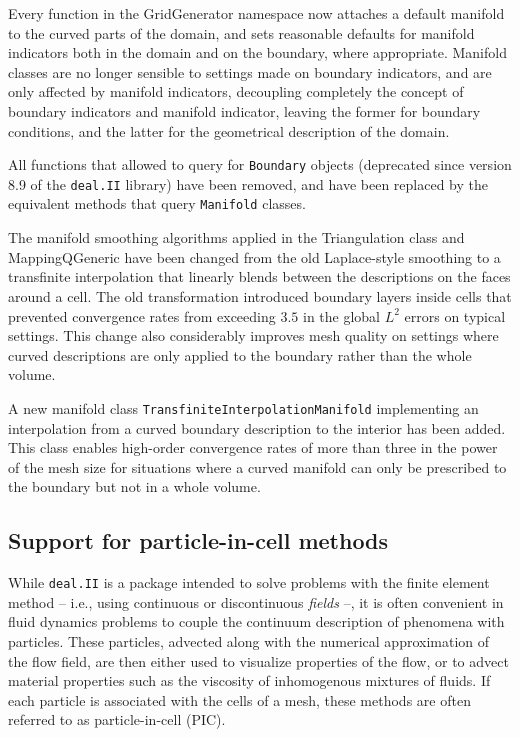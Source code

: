 \documentclass{ansarticle-preprint}
\newcommand{\specialword}[1]{\texttt{#1}}
\newcommand{\dealii}{{\specialword{deal.II}}\xspace}
\begin{document}

Every function in the GridGenerator namespace now attaches a default manifold to
the curved parts of the domain, and sets reasonable defaults for manifold
indicators both in the domain and on the boundary, where appropriate. Manifold
classes are no longer sensible to settings made on boundary indicators, and are
only affected by manifold indicators, decoupling completely the concept of
boundary indicators and manifold indicator, leaving the former for boundary
conditions, and the latter for the geometrical description of the domain.

All functions that allowed to query for \texttt{Boundary} objects (deprecated
since version 8.9 of the \dealii library) have been removed, and have been
replaced by the equivalent methods that query \texttt{Manifold} classes.

The manifold smoothing algorithms applied in the Triangulation class and
MappingQGeneric have been changed from the old Laplace-style smoothing to a
transfinite interpolation that linearly blends between the descriptions on the
faces around a cell. The old transformation introduced boundary layers inside
cells that prevented convergence rates from exceeding \(3.5\) in the global
\(L^2\) errors on typical settings. This change also considerably improves mesh
quality on settings where curved descriptions are only applied to the boundary
rather than the whole volume.

A new manifold class \texttt{TransfiniteInterpolationManifold} implementing an
interpolation from a curved boundary description to the interior has been added.
This class enables high-order convergence rates of more than three in the power
of the mesh size for situations where a curved manifold can only be prescribed
to the boundary but not in a whole volume.

\subsection{Support for particle-in-cell methods}

While \dealii is a package intended to solve problems with the
finite element method -- i.e., using continuous or discontinuous
\textit{fields} --, it is often convenient in fluid dynamics problems to
couple the continuum description of phenomena with particles. These
particles, advected along with the numerical approximation of the flow
field, are then either used to visualize properties of the flow, or to
advect material properties such as the viscosity of inhomogenous
mixtures of fluids. If each particle is associated with the cells
of a mesh, these methods are often referred to as particle-in-cell (PIC).
\end{document}
